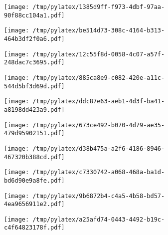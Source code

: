 \documentclass{article}
\begin{document}
\begin{figure}[htbp]
\begin{subfigure}[b]{.3\linewidth}
\texttt{[image: /tmp/pylatex/1385d9ff-f973-4dbf-97aa-90f88cc104a1.pdf]}
\end{subfigure}
\begin{subfigure}[b]{.3\linewidth}
\texttt{[image: /tmp/pylatex/be514d73-308c-4164-b313-464b3df2f0a6.pdf]}
\end{subfigure}
\begin{subfigure}[b]{.3\linewidth}
\texttt{[image: /tmp/pylatex/12c55f8d-0058-4c07-a57f-248dac7c3695.pdf]}
\end{subfigure}
\begin{subfigure}[b]{.3\linewidth}
\texttt{[image: /tmp/pylatex/885ca8e9-c082-420e-a11c-544d5bf3d69d.pdf]}
\end{subfigure}
\begin{subfigure}[b]{.3\linewidth}
\texttt{[image: /tmp/pylatex/ddc87e63-aeb1-4d3f-ba41-a8198dd423a9.pdf]}
\end{subfigure}
\begin{subfigure}[b]{.3\linewidth}
\texttt{[image: /tmp/pylatex/673ce492-b070-4d79-ae35-479d95902151.pdf]}
\end{subfigure}
\begin{subfigure}[b]{.3\linewidth}
\texttt{[image: /tmp/pylatex/d38b475a-a2f6-4186-8946-467320b388cd.pdf]}
\end{subfigure}
\begin{subfigure}[b]{.3\linewidth}
\texttt{[image: /tmp/pylatex/c7330742-a068-468a-ba1d-bd6d90e9a8fe.pdf]}
\end{subfigure}
\begin{subfigure}[b]{.3\linewidth}
\texttt{[image: /tmp/pylatex/9b6872b4-c4a5-4b58-bd57-4ea9656911e2.pdf]}
\end{subfigure}
\begin{subfigure}[b]{.3\linewidth}
\texttt{[image: /tmp/pylatex/a25afd74-0443-4492-b19c-c4f64823178f.pdf]}
\end{subfigure}
\end{figure}
\end{document}
